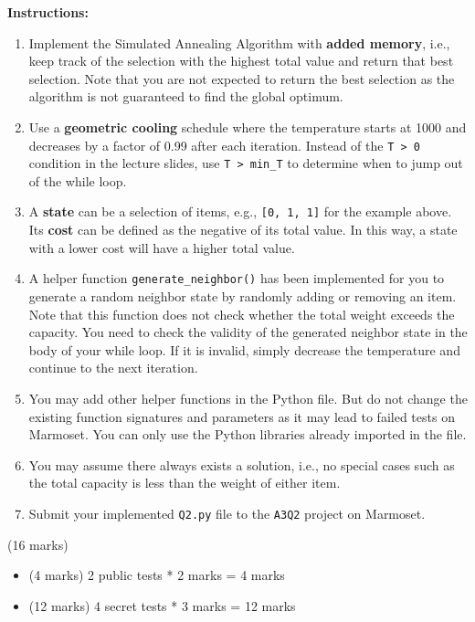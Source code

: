 \documentclass[12pt]{article}
\begin{document}
\textbf{Instructions:}

\begin{enumerate}
    \item Implement the Simulated Annealing Algorithm with \textbf{added memory}, i.e., keep track of the selection with the highest total value and return that best selection. Note that you are not expected to return the best selection as the algorithm is not guaranteed to find the global optimum.
    \item Use a \textbf{geometric cooling} schedule where the temperature starts at 1000 and decreases by a factor of 0.99 after each iteration. Instead of the \texttt{T > 0} condition in the lecture slides, use \texttt{T > min\_T} to determine when to jump out of the while loop.
    \item A \textbf{state} can be a selection of items, e.g., \texttt{[0, 1, 1]} for the example above. Its \textbf{cost} can be defined as the negative of its total value. In this way, a state with a lower cost will have a higher total value.
    \item A helper function \texttt{generate\_neighbor()} has been implemented for you to generate a random neighbor state by randomly adding or removing an item. Note that this function does not check whether the total weight exceeds the capacity. You need to check the validity of the generated neighbor state in the body of your while loop. If it is invalid, simply decrease the temperature and continue to the next iteration.
    \item You may add other helper functions in the Python file. But do not change the existing function signatures and parameters as it may lead to failed tests on Marmoset.
          You can only use the Python libraries already imported in the file.
    \item You may assume there always exists a solution, i.e., no special cases such as the total capacity is less than the weight of either item.
    \item Submit your implemented \texttt{Q2.py} file to the \texttt{A3Q2} project on Marmoset.
\end{enumerate}

\begin{markscheme} (16 marks)
    \begin{itemize}
        \item (4 marks) 2 public tests * 2 marks = 4 marks
        \item (12 marks) 4 secret tests * 3 marks = 12 marks
    \end{itemize}
\end{markscheme}
\end{document}
